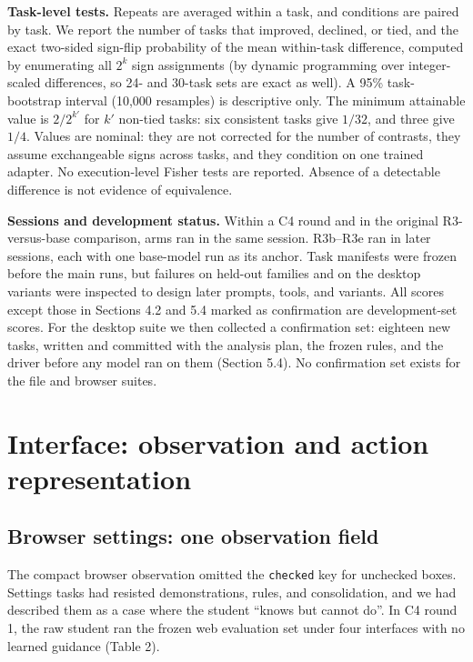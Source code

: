 \documentclass[
  10pt,
]{article}
\begin{document}
\textbf{Task-level tests.} Repeats are averaged within a task, and
conditions are paired by task. We report the number of tasks that
improved, declined, or tied, and the exact two-sided sign-flip
probability of the mean within-task difference, computed by enumerating
all \(2^k\) sign assignments (by dynamic programming over integer-scaled
differences, so 24- and 30-task sets are exact as well). A 95\%
task-bootstrap interval (10,000 resamples) is descriptive only. The
minimum attainable value is \(2/2^{k'}\) for \(k'\) non-tied tasks: six
consistent tasks give \(1/32\), and three give \(1/4\). Values are
nominal: they are not corrected for the number of contrasts, they assume
exchangeable signs across tasks, and they condition on one trained
adapter. No execution-level Fisher tests are reported. Absence of a
detectable difference is not evidence of equivalence.

\textbf{Sessions and development status.} Within a C4 round and in the
original R3-versus-base comparison, arms ran in the same session.
R3b--R3e ran in later sessions, each with one base-model run as its
anchor. Task manifests were frozen before the main runs, but failures on
held-out families and on the desktop variants were inspected to design
later prompts, tools, and variants. All scores except those in Sections
4.2 and 5.4 marked as confirmation are development-set scores. For the
desktop suite we then collected a confirmation set: eighteen new tasks,
written and committed with the analysis plan, the frozen rules, and the
driver before any model ran on them (Section 5.4). No confirmation set
exists for the file and browser suites.

\section{Interface: observation and action
representation}\label{interface-observation-and-action-representation}

\subsection{Browser settings: one observation
field}\label{browser-settings-one-observation-field}

The compact browser observation omitted the \texttt{checked} key for
unchecked boxes. Settings tasks had resisted demonstrations, rules, and
consolidation, and we had described them as a case where the student
``knows but cannot do''. In C4 round 1, the raw student ran the frozen
web evaluation set under four interfaces with no learned guidance (Table
2).
\end{document}
